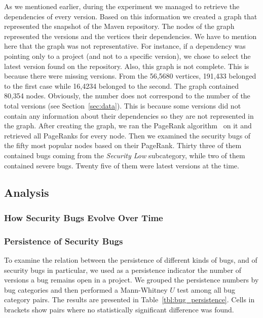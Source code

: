 \documentclass[conference]{llncs}
\begin{document}
As we mentioned earlier, during the experiment we managed to retrieve the
dependencies of every version. Based on this information we created a graph
that represented the snapshot of the Maven repository. The
nodes of the graph represented the versions and the vertices their dependencies.
We have to mention here that the graph was not representative. For instance, if
a dependency was pointing only to a project (and not to a specific version), we chose to
select the latest version found on the repository. Also, this graph is not
complete. This is because there were missing versions.
From the 56,5680 vertices, 191,433
belonged to the first case while 16,4234 belonged to the second.
The graph contained 80,354 nodes. Obviously, the number does not correspond to
the number of the total versions (see Section~\ref{sec:data}). This is because
some versions did not contain any information about their dependencies so they
are not represented in the graph. After creating the graph, we ran the PageRank
algorithm~\cite{BP98} on it and retrieved all PageRanks for every node. Then we
examined the security bugs of the fifty most popular nodes based on their PageRank.
Thirty three of them contained bugs coming from the {\it Security Low} subcategory,
while two of them contained severe bugs. Twenty five of them were latest
versions at the time.

\subsection{Analysis}
\label{sec:analysis}

\subsubsection{How Security Bugs Evolve Over Time}

\subsubsection{Persistence of Security Bugs}

To examine the relation between the persistence of different kinds of
bugs, and of security bugs in particular, we used as a persistence
indicator the number of versions a bug remains open in a project. We
grouped the persistence numbers by bug categories and then performed a
Mann-Whitney $U$ test among all bug category pairs. The results are
presented in Table~\ref{tbl:bug_persistence}. Cells in brackets show
pairs where no statistically significant difference was found.
\end{document}
